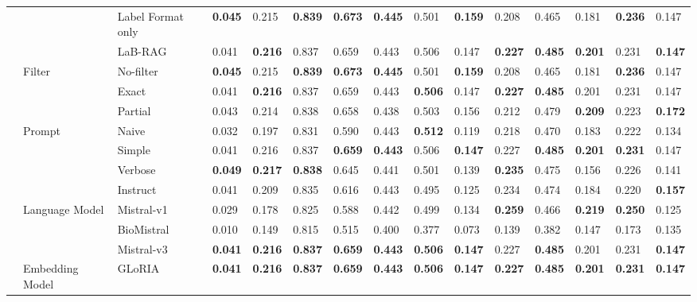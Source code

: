 \begin{tabular}{lllllllllllllll}
 &  & Label Format only & \textbf{0.045} & 0.215 & \textbf{0.839} & \textbf{0.673} & \textbf{0.445} & 0.501 & \textbf{0.159} & 0.208 & 0.465 & 0.181 & \textbf{0.236} & 0.147 \\
 &  & LaB-RAG & 0.041 & \textbf{0.216} & 0.837 & 0.659 & 0.443 & 0.506 & 0.147 & \textbf{0.227} & \textbf{0.485} & \textbf{0.201} & 0.231 & \textbf{0.147} \\
\cmidrule{2-15}
 & \multirow[c]{3}{*}{Filter} & No-filter & \textbf{0.045} & 0.215 & \textbf{0.839} & \textbf{0.673} & \textbf{0.445} & 0.501 & \textbf{0.159} & 0.208 & 0.465 & 0.181 & \textbf{0.236} & 0.147 \\
 &  & Exact & 0.041 & \textbf{0.216} & 0.837 & 0.659 & 0.443 & \textbf{0.506} & 0.147 & \textbf{0.227} & \textbf{0.485} & 0.201 & 0.231 & 0.147 \\
 &  & Partial & 0.043 & 0.214 & 0.838 & 0.658 & 0.438 & 0.503 & 0.156 & 0.212 & 0.479 & \textbf{0.209} & 0.223 & \textbf{0.172} \\
\cmidrule{2-15}
 & \multirow[c]{4}{*}{Prompt} & Naive & 0.032 & 0.197 & 0.831 & 0.590 & 0.443 & \textbf{0.512} & 0.119 & 0.218 & 0.470 & 0.183 & 0.222 & 0.134 \\
 &  & Simple & 0.041 & 0.216 & 0.837 & \textbf{0.659} & \textbf{0.443} & 0.506 & \textbf{0.147} & 0.227 & \textbf{0.485} & \textbf{0.201} & \textbf{0.231} & 0.147 \\
 &  & Verbose & \textbf{0.049} & \textbf{0.217} & \textbf{0.838} & 0.645 & 0.441 & 0.501 & 0.139 & \textbf{0.235} & 0.475 & 0.156 & 0.226 & 0.141 \\
 &  & Instruct & 0.041 & 0.209 & 0.835 & 0.616 & 0.443 & 0.495 & 0.125 & 0.234 & 0.474 & 0.184 & 0.220 & \textbf{0.157} \\
\cmidrule{2-15}
 & \multirow[c]{3}{*}{Language Model} & Mistral-v1 & 0.029 & 0.178 & 0.825 & 0.588 & 0.442 & 0.499 & 0.134 & \textbf{0.259} & 0.466 & \textbf{0.219} & \textbf{0.250} & 0.125 \\
 &  & BioMistral & 0.010 & 0.149 & 0.815 & 0.515 & 0.400 & 0.377 & 0.073 & 0.139 & 0.382 & 0.147 & 0.173 & 0.135 \\
 &  & Mistral-v3 & \textbf{0.041} & \textbf{0.216} & \textbf{0.837} & \textbf{0.659} & \textbf{0.443} & \textbf{0.506} & \textbf{0.147} & 0.227 & \textbf{0.485} & 0.201 & 0.231 & \textbf{0.147} \\
\cmidrule{2-15}
 & \multirow[c]{2}{*}{Embedding Model} & GLoRIA & \textbf{0.041} & \textbf{0.216} & \textbf{0.837} & \textbf{0.659} & \textbf{0.443} & \textbf{0.506} & \textbf{0.147} & \textbf{0.227} & \textbf{0.485} & \textbf{0.201} & \textbf{0.231} & \textbf{0.147} \\

\end{tabular}
